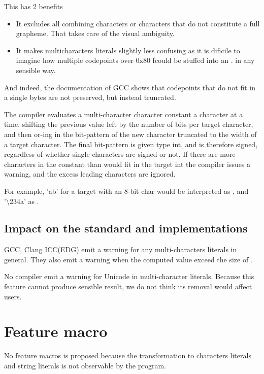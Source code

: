 \documentclass{wg21}
\begin{document}
This has 2 benefits
\begin{itemize}
\item It excludes all combining characters or characters that do not constitute a full grapheme. That takes care of the visual ambiguity.
\item It makes multicharacters literals slightly less confusing as it is dificile to imagine how multiple codepoints over 0x80 fcould be stuffed into an .
in any sensible way.
\end{itemize}
And indeed, the documentation of GCC shows that codepoints that do not fit in a single bytes are not preserved, but instead truncated.
\begin{quoteblock}
The compiler evaluates a multi-character character constant a character at a time, shifting the previous value left by the number of bits per target character, and then or-ing in the bit-pattern of the new character truncated to the width of a target character. The final bit-pattern is given type int, and is therefore signed, regardless of whether single characters are signed or not. If there are more characters in the constant than would fit in the target int the compiler issues a warning, and the excess leading characters are ignored.

For example, 'ab' for a target with an 8-bit char would be interpreted as , and '\textbackslash 234a' as .
\end{quoteblock}

\subsection{Impact on the standard and implementations}

GCC, Clang ICC(EDG) emit a warning for any multi-characters literals in general. They also emit a warning when the computed value exceed the size of . 

No compiler emit a warning for Unicode in multi-character literals.
Because this feature cannot produce sensible result, we do not think its removal would affect users.

\section{Feature macro}

No feature macros is proposed because the transformation to characters literals and string literals is not observable by the program.
\end{document}
